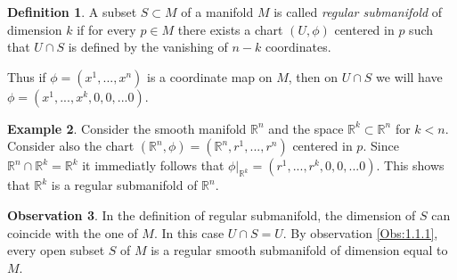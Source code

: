 \documentclass[12pt,a4paper]{report}
\theoremstyle{definition}
\newtheorem{Def}{Definition}[chapter]
\theoremstyle{Theorem}
\theoremstyle{definition}
\newtheorem{Ex}[Def]{Example}
\theoremstyle{definition}
\newtheorem{Obs}[Def]{Observation}
\begin{document}
		\begin{Def}
			A subset $S\subset M$ of a manifold $M$ is called \textit{regular submanifold} of dimension $k$ if for every $p\in M$ there exists a chart $(U,\phi)$ centered in $p$ such that $U\cap S$ is defined by the vanishing of $n-k$ coordinates.
		\end{Def}
		Thus if $\phi=(x^1,...,x^n)$ is a coordinate map on $M$, then on $U\cap S$ we will have $\phi=(x^1,...,x^k,0,0,...0)$.
		\begin{Ex}
			Consider the smooth manifold $\mathbb{R}^n$ and the space $\mathbb{R}^k\subset\mathbb{R}^n$ for $k<n$. Consider also the chart $(\mathbb{R}^n,\phi)=(\mathbb{R}^n,r^1,...,r^n)$ centered in $p$. Since $\mathbb{R}^n\cap \mathbb{R}^k=\mathbb{R}^k$ it immediatly follows that $\phi|_{\mathbb{R}^k}=(r^1,...,r^k,0,0,...0)$. This shows that $\mathbb{R}^k$ is a regular submanifold of $\mathbb{R}^n$.
		\end{Ex}
		\begin{Obs} \label{Obs:1.1.2}
			In the definition of regular submanifold, the dimension of $S$ can coincide with the one of $M$. In this case $U\cap S=U$. By observation \ref{Obs:1.1.1}, every open subset $S$ of $M$ is a regular smooth submanifold of dimension equal to $M$.
		\end{Obs}
\end{document}
